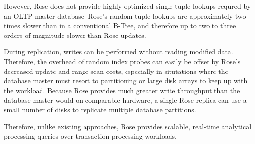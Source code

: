 \documentclass{vldb}
\newcommand{\rows}{Rose\xspace}
\newcommand{\rowss}{Rose's\xspace}
\begin{document}
However, \rows does not provide highly-optimized single tuple lookups
requred by an OLTP master database.  \rowss random tuple lookups are
approximately two times slower than in a conventional B-Tree, and therefore
up to two to three orders of magnitude slower than \rows updates.

During replication, writes can be performed without reading modified data.  Therefore, the overhead of random index probes can easily be offset by
\rowss decreased update and range scan costs, especially in situtations where the
database master must resort to partitioning or large disk arrays to
keep up with the workload.  Because \rows provides much greater write
throughput than the database master would on comparable hardware, a
single \rows replica can use a small number of disks to replicate
multiple database partitions.

Therefore, unlike existing approaches, \rows provides scalable,
real-time analytical processing queries over transaction processing
workloads.




\end{document}
